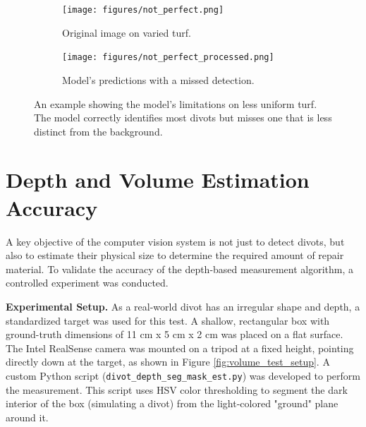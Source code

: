\begin{figure}[h!]
    \centering
    \begin{subfigure}[b]{0.49\textwidth}
        \centering
        \texttt{[image: figures/not\_perfect.png]} 
        \caption{Original image on varied turf.}
        \label{fig:bad_original}
    \end{subfigure}
    \hfill 
    \begin{subfigure}[b]{0.49\textwidth}
        \centering
        \texttt{[image: figures/not\_perfect\_processed.png]} 
        \caption{Model's predictions with a missed detection.}
        \label{fig:bad_prediction}
    \end{subfigure}
    \caption[Limitations of divot detection on varied turf.] 
    {An example showing the model's limitations on less uniform turf. The model correctly identifies most divots but misses one that is less distinct from the background.}
    \label{fig:real_world_bad}
\end{figure}

\section{Depth and Volume Estimation Accuracy}
\label{sec:volume_evaluation}
A key objective of the computer vision system is not just to detect divots, but also to estimate their physical size to determine the required amount of repair material. To validate the accuracy of the depth-based measurement algorithm, a controlled experiment was conducted.

\textbf{Experimental Setup.}
As a real-world divot has an irregular shape and depth, a standardized target was used for this test. A shallow, rectangular box with ground-truth dimensions of 11 cm x 5 cm x 2 cm was placed on a flat surface. The Intel RealSense camera was mounted on a tripod at a fixed height, pointing directly down at the target, as shown in Figure \ref{fig:volume_test_setup}. A custom Python script (\texttt{divot\_depth\_seg\_mask\_est.py}) was developed to perform the measurement. This script uses HSV color thresholding to segment the dark interior of the box (simulating a divot) from the light-colored "ground" plane around it.


